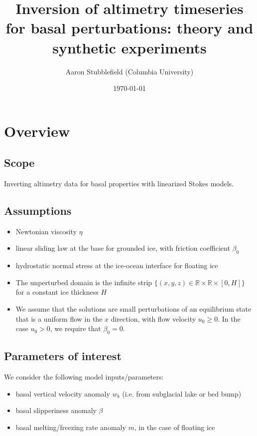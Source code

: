 \documentclass[paper=a4, fontsize=11pt]{article}
\title{
Inversion of altimetry timeseries for basal perturbations: theory
and synthetic experiments
}
\author{ Aaron Stubblefield (Columbia University)} %
\date{\small\today} %
\begin{document}
\maketitle %

\section*{Overview}
\subsection*{Scope}
Inverting altimetry data for basal properties with linearized Stokes models.

\subsection*{Assumptions}
\begin{itemize}
\item Newtonian viscosity $\eta$
\item linear sliding law at the base for grounded ice, with friction coefficient $\beta_0$
\item hydrostatic normal stress at the ice-ocean interface for floating ice
\item The unperturbed domain is the infinite strip $\{(x,y,z)\in\mathbb{R}\times\mathbb{R}\times[0,H]\}$ for a
constant ice thickness $H$
\item We assume that the solutions are small perturbations of an equilibrium state
that is a uniform flow in the $x$ direction, with flow velocity $u_0\geq 0$.
In the case $u_0>0$, we require that $\beta_0=0$.
\end{itemize}

\subsection*{Parameters of interest}
We consider the following model inputs/parameters:
\begin{itemize}
\item basal vertical velocity anomaly $w_b$ (i.e. from subglacial lake or bed bump)
\item basal slipperiness anomaly $\beta$
\item basal melting/freezing rate anomaly $m$, in the case of floating ice
\end{itemize}
\end{document}
